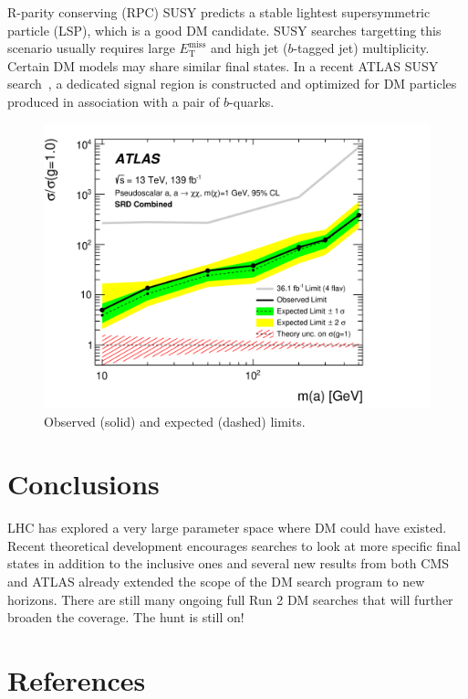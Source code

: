 \documentclass{moriond}
\def\et{E_\textrm{T}^{\textrm{miss}}}
\begin{document}
R-parity conserving (RPC) SUSY predicts a stable lightest supersymmetric
particle (LSP), which is a good DM candidate. SUSY searches targetting this
scenario usually requires large $\et$ and high jet ($b$-tagged jet)
multiplicity. Certain DM models may share similar final states. In a recent
ATLAS SUSY search~\cite{dmbb}, a dedicated signal region is constructed and
optimized for DM particles produced in association with a pair of $b$-quarks.      

\begin{figure} [htb]
\centerline{\includegraphics[width=0.5\linewidth]{DMBB}}
\caption[]{Observed (solid) and expected (dashed) limits.}
\label{fig:dmbb}
\end{figure}

\section{Conclusions}

LHC has explored a very large parameter space where DM could have existed.
Recent theoretical development encourages searches to look at more specific
final states in addition to the inclusive ones and several new results from
both CMS and ATLAS already extended the scope of the DM search program to new
horizons. There are still many ongoing full Run 2 DM searches that will further
broaden the coverage. The hunt is still on!

\section*{References}
\end{document}
